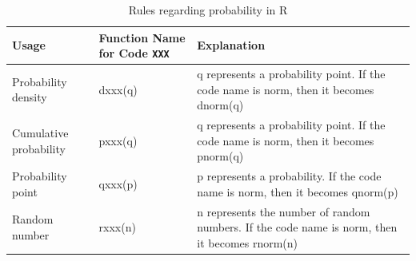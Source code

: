 \begin{table}[ht]
	\caption{Rules regarding probability in R}
	\centering
	\begin{tabular}{lll}
		Usage                  & Function Name for Code \texttt{XXX} & Explanation                                                                                   \\\hline
		Probability density    & dxxx(q)                             & q represents a probability point. If the code name is norm, then it becomes dnorm(q)          \\
		Cumulative probability & pxxx(q)                             & q represents a probability point. If the code name is norm, then it becomes pnorm(q)          \\
		Probability point      & qxxx(p)                             & p represents a probability. If the code name is norm, then it becomes qnorm(p)                \\
		Random number          & rxxx(n)                             & n represents the number of random numbers. If the code name is norm, then it becomes rnorm(n) \\\hline
	\end{tabular}
	\label{tbl::08_02}
\end{table}
